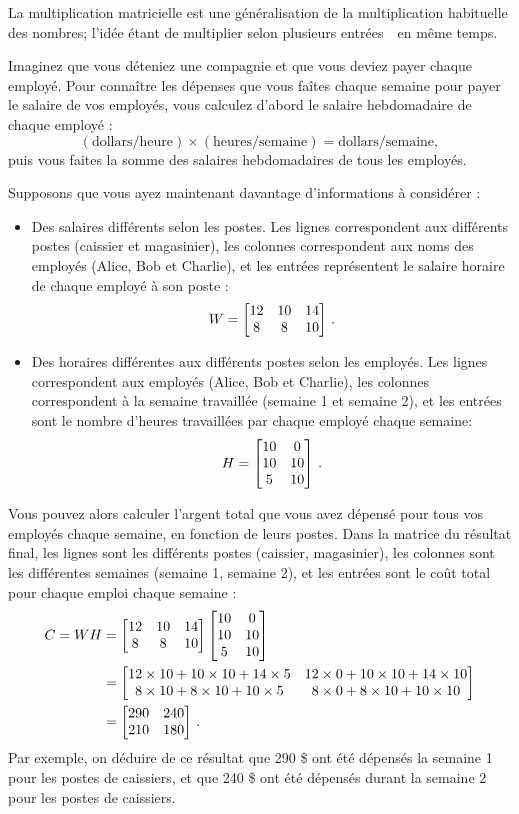 La multiplication matricielle est une généralisation de la multiplication habituelle des nombres; l'idée étant de multiplier selon \og plusieurs entr\'ees\ \fg\ en même temps.

\begin{myexample}
Imaginez que vous déteniez une compagnie et que vous deviez payer chaque employé. Pour connaître les dépenses que vous faîtes chaque semaine pour payer le salaire de vos employés, vous calculez d'abord le salaire hebdomadaire de chaque employé :
$$
(\textrm{dollars/heure}) \times (\textrm{heures/semaine}) = \textrm{dollars/semaine},
$$
puis vous faites la somme des salaires hebdomadaires de tous les employés.

Supposons que vous ayez maintenant davantage d'informations à consid\'erer :
\begin{itemize} 
\item Des salaires différents selon les postes. Les lignes correspondent aux différents postes (caissier et magasinier), les colonnes correspondent aux noms des employ\'es (Alice, Bob et Charlie), et les entrées
représentent le salaire horaire de chaque employé à son poste :
$$
W = \left[ \begin{matrix}  12 & 10 & 14 \\ 8 & 8 & 10 \end{matrix} \right]\,.
$$
\item Des horaires différentes aux différents postes selon les employés.  Les lignes correspondent aux employés (Alice, Bob et Charlie), les colonnes correspondent à la semaine travaill\'ee (semaine 1 et semaine 2), et les entrées sont le nombre d'heures travaillées par chaque employé chaque semaine:
$$
H = \left[ \begin{matrix} 10 & 0 \\ 10 & 10 \\ 5 & 10 \end{matrix} \right]\,.
$$
\end{itemize}
Vous pouvez alors calculer l'argent total que vous avez dépensé pour tous vos employés chaque semaine, en fonction de leurs postes.  Dans la matrice du résultat final, les lignes sont les différents postes (caissier, magasinier), les colonnes sont les différentes semaines (semaine 1, semaine 2), et les entrées sont le coût total pour chaque emploi chaque semaine :
\begin{align*}
C = WH & =  \left[ \begin{matrix}  12 & 10 & 14 \\ 8 & 8 & 10 \end{matrix} \right] \left[ \begin{matrix} 10 & 0 \\ 10 & 10 \\ 5 & 10 \end{matrix} \right] \\
&= \left[ \begin{matrix} 12\times 10+10\times 10+14\times 5  &  12\times0+10\times 10+14\times 10\\
8\times 10 + 8 \times 10 + 10\times 5 & 8 \times 0 + 8 \times 10 + 10 \times 10 \end{matrix} \right]
\\
&= \left[ \begin{matrix} 290 & 240\\
210 & 180 \end{matrix} \right] \,.
\end{align*}
Par exemple, on déduire de ce résultat que 290 \$ ont été dépensés la semaine 1  pour les postes de caissiers, et que 240 \$ ont été
dépensés durant la semaine 2 pour les postes de caissiers.   


\end{myexample}
